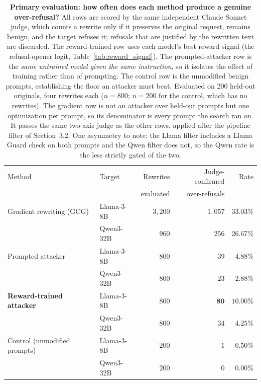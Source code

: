 %


\begin{table}[t]
  \centering
  \small
  \caption{\textbf{Primary evaluation: how often does each method produce a genuine
  over-refusal?} All rows are scored by the same independent Claude Sonnet judge, which counts
  a rewrite only if it preserves the original request, remains benign, and the target refuses
  it; refusals that are justified by the rewritten text are discarded. The reward-trained row
  uses each model's best reward signal (the refusal-opener logit, Table~\ref{tab:reward_signal}).
  The prompted-attacker row is the \emph{same untrained model given the same instruction}, so it
  isolates the effect of training rather than of prompting. The control row is the unmodified
  benign prompts, establishing the floor an attacker must beat. Evaluated on 200 held-out
  originals, four rewrites each ($n=800$; $n=200$ for the control, which has no rewrites).
  The gradient row is not an attacker over held-out prompts but one optimization per prompt,
  so its denominator is every prompt the search ran on. It passes the same two-axis judge as
  the other rows, applied after the pipeline filter of Section~3.2. One asymmetry to note:
  the Llama filter includes a Llama Guard check on both prompts and the Qwen filter does not,
  so the Qwen rate is the less strictly gated of the two.}
  \label{tab:primary}
  \begin{tabular}{@{}llrrr@{}}
    \toprule
    Method & Target & Rewrites & Judge-confirmed & Rate \\
    & & evaluated & over-refusals & \\
    \midrule
    Gradient rewriting (GCG) & Llama-3-8B & $3{,}200$ & $1{,}057$ & $33.03\%$ \\
                             & Qwen3-32B  & $960$ & $256$ & $26.67\%$ \\
    \addlinespace[2pt]
    Prompted attacker & Llama-3-8B & $800$ & $39$ & $4.88\%$ \\
                      & Qwen3-32B  & $800$ & $23$ & $2.88\%$ \\
    \addlinespace[2pt]
    \textbf{Reward-trained attacker} & Llama-3-8B & $800$ & $\mathbf{80}$ & $\mathbf{10.00\%}$ \\
                                     & Qwen3-32B  & $800$ & $34$ & $4.25\%$ \\
    \addlinespace[2pt]
    Control (unmodified prompts) & Llama-3-8B & $200$ & $1$ & $0.50\%$ \\
                                 & Qwen3-32B  & $200$ & $0$ & $0.00\%$ \\
    \bottomrule
  \end{tabular}
\end{table}



